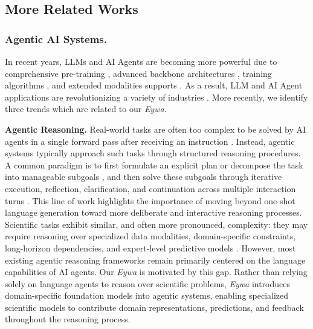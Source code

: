 \subsection{More Related Works}
\label{ap:related_work}


\subsubsection{Agentic AI Systems.} 
In recent years, LLMs and AI Agents are becoming more powerful due to comprehensive pre-training \cite{DBLP:journals/corr/abs-2601-03267}, advanced backbone architectures \cite{DBLP:journals/corr/abs-2505-06708, DBLP:journals/corr/abs-2510-26692}, training algorithms \cite{DBLP:journals/corr/abs-2501-12948}, and extended modalities supports \cite{DBLP:journals/corr/abs-2603-03276, DBLP:journals/corr/abs-2505-07062, DBLP:journals/corr/abs-2509-17765}. As a result, LLM and AI Agent applications are revolutionizing a variety of industries \cite{DBLP:journals/corr/abs-2503-21460}. More recently, we identify three trends which are related to our \textit{Eywa}.

\textbf{Agentic Reasoning.}
Real-world tasks are often too complex to be solved by AI agents in a single forward pass after receiving an instruction \cite{DBLP:journals/corr/abs-2602-07338}. Instead, agentic systems typically approach such tasks through structured reasoning procedures. A common paradigm is to first formulate an explicit plan or decompose the task into manageable subgoals \cite{DBLP:conf/nips/0001ST00Z23,ningmc}, and then solve these subgoals through iterative execution, reflection, clarification, and continuation across multiple interaction turns \cite{DBLP:journals/corr/abs-2509-23537, DBLP:journals/corr/abs-2601-11868, DBLP:journals/corr/abs-2603-00873}. This line of work highlights the importance of moving beyond one-shot language generation toward more deliberate and interactive reasoning processes.
Scientific tasks exhibit similar, and often more pronounced, complexity: they may require reasoning over specialized data modalities, domain-specific constraints, long-horizon dependencies, and expert-level predictive models \cite{jumper2021highly, merchant2023scaling, DBLP:journals/corr/abs-2507-01903, DBLP:journals/corr/abs-2508-14111, DBLP:journals/corr/abs-2511-02864}. However, most existing agentic reasoning frameworks remain primarily centered on the language capabilities of AI agents. Our \textit{Eywa} is motivated by this gap. Rather than relying solely on language agents to reason over scientific problems, \textit{Eywa} introduces domain-specific foundation models into agentic systems, enabling specialized scientific models to contribute domain representations, predictions, and feedback throughout the reasoning process.


